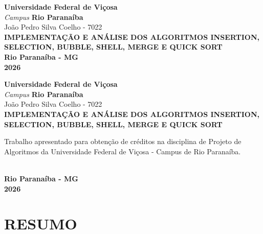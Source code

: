\documentclass[12pt,arial]{article}
\author{João Pedro Silva Coelho}
\begin{document}
	\begin{titlepage}
		\begin{center}
			\textbf{Universidade Federal de Viçosa}
			\textit{\\Campus}
			\textbf{Rio Paranaíba}
			\textnormal{\\\vspace{4cm}João Pedro Silva Coelho - 7022}
			\textbf{\\\vspace{5cm}IMPLEMENTAÇÃO E ANÁLISE DOS ALGORITMOS INSERTION, SELECTION, BUBBLE, SHELL, MERGE E QUICK SORT}
			\textbf{\\\vspace{6.5cm}Rio Paranaíba - MG \\ 2026}
		\end{center}
	\end{titlepage}

		\begin{titlepage}
			\begin{center}
				\textbf{Universidade Federal de Viçosa}
				\textit{\\Campus}
				\textbf{Rio Paranaíba}
				\textnormal{\\\vspace{3cm}João Pedro Silva Coelho - 7022}
				\textbf{\\\vspace{4cm}IMPLEMENTAÇÃO E ANÁLISE DOS ALGORITMOS INSERTION, SELECTION, BUBBLE, SHELL, MERGE E QUICK SORT\vspace{3cm}}
					\begin{flushright}
						\begin{minipage}{.5\textwidth}
							\textnormal{Trabalho apresentado para obtenção de créditos na disciplina de Projeto de Algoritmos da Universidade Federal de Viçosa - Campus de Rio Paranaíba.}
						\end{minipage}
					\end{flushright}

				\textbf{\\\vspace{3cm}Rio Paranaíba - MG \\ 2026}

			\end{center}
		\end{titlepage}


		\section{RESUMO}
		
		\newpage
\end{document}
